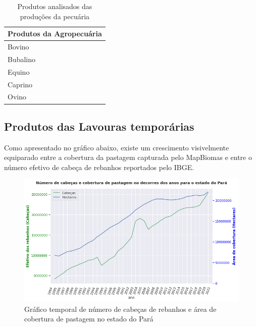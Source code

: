 \begin{center}
    \begin{table}[!htb]
        \centering
        \begin{tabular}{|l|}
        \hline
        \textbf{Produtos da Agropecuária} \\ 
            \hline  
            \hspace{0.3cm} Bovino \\
            \hline  
            \hspace{0.3cm} Bubalino \\
            \hline  
            \hspace{0.3cm} Equino \\
            \hline  
            \hspace{0.3cm} Caprino \\
            \hline  
            \hspace{0.3cm} Ovino \\
            \hline  
            \end{tabular}
        \caption{Produtos analisados das produções da pecuária}
        \label{tab:produto_analisados-pecuaria}
    \end{table}
\end{center}


\newpage
\subsection{Produtos das Lavouras temporárias}

Como apresentado no gráfico abaixo, existe um crescimento visivelmente equiparado entre a cobertura da pastagem capturada pelo MapBiomas e entre o número efetivo de cabeça de rebanhos reportados pelo IBGE.

\begin{figure}[hbt!]
    \centering
    \includegraphics[width=0.6\columnwidth]{src/plots/plot-cobertura_pastagem-numero_cabecas.png}
    \centering
    \caption{Gráfico temporal de número de cabeças de rebanhos e área de cobertura de pastagem no estado do Pará}
    \label{fig:cobertura_pastagem-numero_cabeca}
\end{figure}

